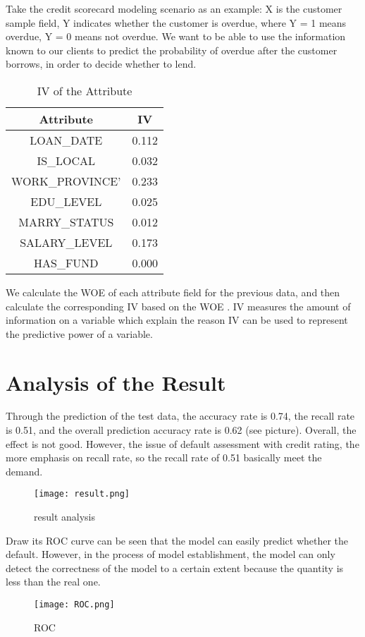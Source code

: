 \documentclass{mcmthesis}
\begin{document}
Take the credit scorecard modeling scenario as an example: X is the customer sample field, Y indicates whether the customer is overdue, where Y = 1 means overdue, Y = 0 means not overdue. We want to be able to use the information known to our clients to predict the probability of overdue after the customer borrows, in order to decide whether to lend.

\begin{table}[h]
\centering
\caption{IV of the Attribute}
\begin{tabular}{|c|c|}
\hline
Attribute & IV\\
\hline
LOAN\_DATE & 0.112\\
\hline
IS\_LOCAL & 0.032\\
\hline
WORK\_PROVINCE' & 0.233\\
\hline
EDU\_LEVEL & 0.025\\
\hline
MARRY\_STATUS & 0.012\\
\hline
SALARY\_LEVEL & 0.173\\
\hline
HAS\_FUND & 0.000\\
\hline
\end{tabular}
\label{tab2}
\end{table}

We calculate the WOE of each attribute field for the previous data, and then calculate the corresponding IV based on the WOE . IV measures the amount of information on a variable which explain the reason IV can be used to represent the predictive power of a variable.
\section{Analysis of the Result}
Through the prediction of the test data, the accuracy rate is 0.74, the recall rate is 0.51, and the overall prediction accuracy rate is 0.62 (see picture). Overall, the effect is not good. However, the issue of default assessment with credit rating, the more emphasis on recall rate, so the recall rate of 0.51 basically meet the demand.
\newpage
\begin{figure}[h]
\small
\centering
\texttt{[image: result.png]}
\caption{result analysis} \label{fig:result analysis}
\end{figure}

Draw its ROC curve can be seen that the model can easily predict whether the default. However, in the process of model establishment, the model can only detect the correctness of the model to a certain extent because the quantity is less than the real one.
\begin{figure}[h]
\small
\centering
\texttt{[image: ROC.png]}
\caption{ROC} \label{fig:ROC}
\end{figure}
\end{document}
